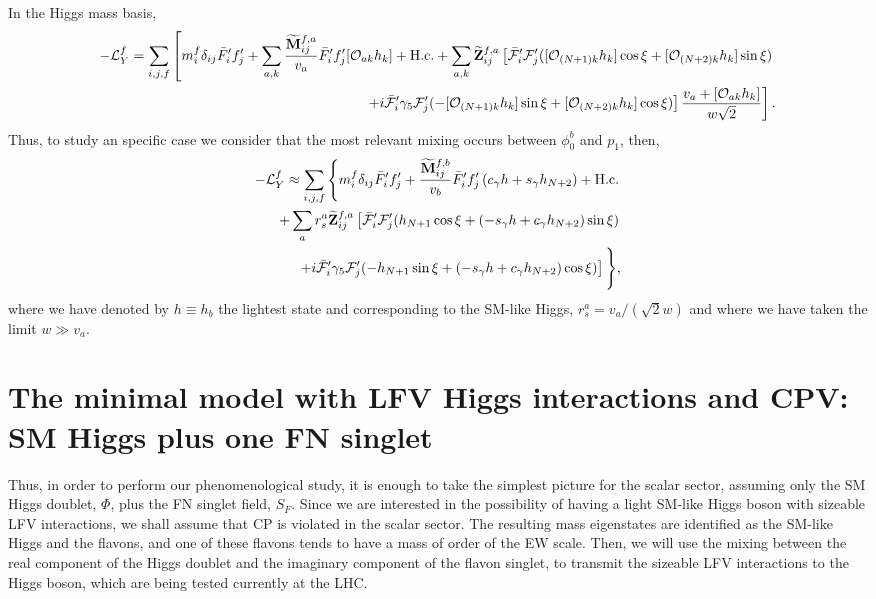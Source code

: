 \documentclass[aps,prd,groupaddress,floatfix,tighten,nofootinbib,showpacs,
amsfonts,superscriptaddress]{revtex4}
\begin{document}
In the Higgs mass basis,
%
\begin{eqnarray} \label{Eq16}
\begin{split}
		-{\cal L}_Y^f = \sum_{i,j,f} \left[ m^f_i \delta_{ij}
		\bar{F}'_{i} f'_j  + \sum_{a,k} \frac{\widetilde{\bf M}^{f,a}_{ij}}{v_a} \bar{F}'_{i} f'_j [{\cal O}_{ak} h_k] + {\textrm{H.c.}} 
		+ \sum_{a,k} \widetilde{\bf Z}_{ij}^{f,a} \left[ \bar{\cal F}'_{i} {\cal F}'_j ([{\cal O}_{(N+1)k} h_k]  \cos \xi + [{\cal O}_{(N+2)k} h_k]  \sin \xi ) 
		\right. \right. \\ \left. \left.
+  {i} \bar{\cal F}'_{i} \gamma_5 {\cal F}'_j (- [{\cal O}_{(N+1)k} h_k]  \sin \xi + [{\cal O}_{(N+2)k} h_k]  \cos \xi ) \right] \frac{v_a + [{\cal O}_{ak} h_k]}{w\sqrt{2}} \right].
\end{split}
\end{eqnarray}
Thus, to study an specific case we consider that the most relevant mixing occurs between $\phi_0^b$ and $p_1$, then,
	\begin{eqnarray}  \begin{split}
		-{\cal L}_Y^{f} \approx \sum_{i,j, f} \left \lbrace m_i^f \delta_{ij}
		\bar{F}'_{i} f'_j  + \frac{\widetilde{\bf M}^{f,b}_{ij}}{v_b} \bar{F}'_{i} f'_j  \left( c_{\gamma} h + s_{\gamma} h_{N+2} \right) +  {\textrm{H.c.}}
		 \right. \\
		 +  \sum_{a} r_s^a \widetilde{\bf Z}_{ij}^{f,a} \left[  \bar{\cal F}'_{i} {\cal F}'_j  ( h_{N+1}  \cos \xi +  \left( -s_{\gamma} h + c_{\gamma} h_{N+2} \right)   \sin \xi )
	 \right.\\ \left. + i \bar{\cal F}'_{i} \gamma_5 {\cal F}'_j  (- h_{N+1}  \sin \xi + \left( -s_{\gamma} h + c_{\gamma} h_{N+2} \right)  \cos \xi ) \right] 
		 \Bigg \rbrace, \end{split}
	\end{eqnarray}	
where we have denoted by $h \equiv h_b$ the lightest state and corresponding to the SM-like Higgs,
$r_s^a= v_a/(\sqrt{2}w)$ and where we have taken the limit $w \gg v_a$.


\section{The minimal model with LFV Higgs interactions and CPV: SM Higgs plus one FN singlet\label{Sec:Model}}


Thus, in order to perform our phenomenological study, it is enough to take the simplest picture for the scalar sector, 
assuming  only the SM Higgs doublet, $\Phi$, plus the FN singlet field, {$S_F$}.
Since we are interested in the possibility of having a light SM-like Higgs boson with 
sizeable LFV interactions,  we shall assume that CP is violated in the scalar sector. 
The resulting  mass eigenstates are identified as the SM-like Higgs and the flavons, and one of these flavons 
tends to have a mass of order of the EW scale.
Then, we will use the mixing between the real component of the Higgs doublet and the imaginary component of the flavon 
singlet, to transmit the sizeable LFV interactions to the Higgs boson, which are being tested currently at the LHC. 
\end{document}
